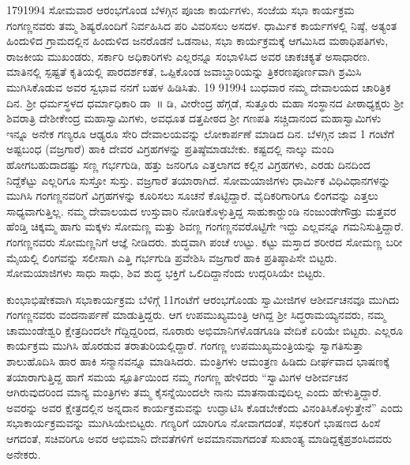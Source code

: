 {17\enginline{-}9\enginline{-}1994 ಸೋಮವಾರ ಆರಂಭಗೊಂಡ ಬೆಳಗ್ಗಿನ ಪೂಜಾ ಕಾರ್ಯಗಳು, ಸಂಜೆಯ ಸಭಾ ಕಾರ್ಯಕ್ರಮ ಗಂಗಣ್ಣನವರು ತಮ್ಮ ಶಿಷ್ಯರೊಂದಿಗೆ ನಿರ್ವಹಿಸಿದ ಪರಿ ವಿವರಿಸಲು ಅಸದಳ. ಧಾರ್ಮಿಕ ಕಾರ್ಯಗಳಲ್ಲಿ ನಿಷ್ಠೆ, ಅತ್ಯಂತ ಹಿಂದುಳಿದ ಗ್ರಾಮ\-ದಲ್ಲಿನ ಹಿಂದುಳಿದ ಜನರೊಡನೆ ಒಡನಾಟ, ಸಭಾ ಕಾರ್ಯಕ್ರಮಕ್ಕೆ ಆಗಮಿಸಿದ ಮಠಾಧಿ\-ಪತಿಗಳು, ರಾಜಕೀಯ  ಮುಖಂಡರು,  ಸರ್ಕಾರಿ ಅಧಿಕಾರಿಗಳು ಎಲ್ಲರನ್ನೂ ಸಂಭಾಳಿಸಿದ ಅವರ ಚಾಕಚಕ್ಯತೆ ಅಸಾಧಾರಣ. ಮಾತಿನಲ್ಲಿ ಸ್ಪಷ್ಟತೆ ಕೃತಿಯಲ್ಲಿ ಪಾರದರ್ಶಕತೆ, ಒಪ್ಪಿಕೊಂಡ ಜವಾಬ್ದಾರಿಯನ್ನು ತ್ರಿಕರಣಪೂರ್ಣವಾಗಿ ಶ್ರಮಿಸಿ ಮುಗಿಸಿಕೊಡುವ ಅವರ ಸ್ವಭಾವ ನನಗೆ ಬಹಳ ಹಿಡಿಸಿತು. 19 \enginline{-}9\enginline{-}1994 ಬುಧವಾರ ನಮ್ಮ ದೇವಾಲಯದ ಚಾರಿತ್ರಿಕ ದಿನ. ಶ್ರೀ ಧರ್ಮಸ್ಥಳದ ಧರ್ಮಾಧಿಕಾರಿ ಡಾ~॥ ಡಿ, ವೀರೇಂದ್ರ ಹೆಗ್ಗಡೆ, ಸುತ್ತೂರು ಮಹಾ ಸಂಸ್ಥಾನದ ಪೀಠಾಧ್ಯಕ್ಷರು ಶ್ರೀ ಶಿವರಾತ್ರಿ ದೇಶೀಕೇಂದ್ರ ಮಹಾಸ್ವಾಮಿಗಳು, ಅವಧೂತ ದತ್ತಪೀಠದ ಶ್ರೀ ಗಣಪತಿ ಸಚ್ಚಿದಾನಂದ ಮಹಾಸ್ವಾಮಿಗಳು ಇನ್ನೂ ಅನೇಕ ಗಣ್ಯರೂ ಆಢ್ಯರೂ ಸೇರಿ ದೇವಾಲಯವನ್ನು ಲೋಕಾರ್ಪಣೆ ಮಾಡಿದ ದಿನ. ಬೆಳಗ್ಗಿನ ಜಾವ 1 ಗಂಟೆಗೆ ಅಷ್ಟಬಂಧ (ವಜ್ರಗಾರೆ) ಹಾಕಿ ದೇವರ ವಿಗ್ರಹಗಳನ್ನು  ಪ್ರತಿಷ್ಠೆಮಾಡಬೇಕು. ಕಷ್ಟದಲ್ಲಿ ನಾಲ್ಕು ಮಂದಿ ಹೋಗಬಹುದಾದಷ್ಟು ಸಣ್ಣ ಗರ್ಭಗುಡಿ, ಹತ್ತು ಜನರಿಗೂ ಎತ್ತಲಾಗದ ಕಲ್ಲಿನ ವಿಗ್ರಹಗಳು, ಎರಡು ದಿನದಿಂದ ನಿದ್ದೆಕೆಟ್ಟು ಎಲ್ಲರಿಗೂ ಸುಸ್ತೋ ಸುಸ್ತು. ವಜ್ರಗಾರೆ ತಯಾರಾಗಿದೆ. ಸೋಮಯಾಜಿಗಳು ಧಾರ್ಮಿಕ ವಿಧಿವಿಧಾನಗಳನ್ನು ಮುಗಿಸಿ ಗಂಗಣ್ಣನವರಿಗೆ ವಿಗ್ರಹಗಳನ್ನು ಕೂರಿಸಲು ಸೂಚನೆ ಕೊಟ್ಟಿದ್ದಾರೆ. ವೈದಿಕರಿ\-ಗಾರಿಗೂ ಲಿಂಗವನ್ನು ಎತ್ತಲು ಸಾಧ್ಯವಾಗುತ್ತಿಲ್ಲ. ನಮ್ಮ ದೇವಾಲಯದ ಉಸ್ತುವಾರಿ ನೋಡಿಕೊಳ್ಳುತ್ತಿದ್ದ ಸಾಹುಕಾರ್‍ಹುಂಡಿ ನಂಜುಂಡೇಗೌಡ್ರು ಮತ್ತವರ ಹೆಂಡ್ತಿ ಚಿಕ್ಕಮ್ಮ ಹಾಗು ಮಕ್ಕಳು ಸೋಮಣ್ಣ ಮತ್ತು ಶಿವಣ್ಣ ಗಂಗಣ್ಣನವರೊಟ್ಟಿಗೇ ಇದ್ದು ಎಲ್ಲವನ್ನೂ ಗಮನಿಸುತ್ತಿದ್ದಾರೆ. ಗಂಗಣ್ಣನವರು ಸೋಮಣ್ಣನಿಗೆ ಆಜ್ಞೆ ನೀಡಿದರು. ಶುದ್ಧವಾಗಿ ಪಂಚೆ ಉಟ್ಟು. ಕಟ್ಟು ಮಸ್ತಾದ ಶರೀರದ ಸೋಮಣ್ಣ ಬರೀ ಮೈಯಲ್ಲಿ ಲಿಂಗವನ್ನು ಸಲೀಸಾಗಿ ಎತ್ತಿ ಗರ್ಭಗುಡಿ ಪ್ರವೇಶಿಸಿ ವಜ್ರಗಾರೆ ಹಾಕಿ ಪ್ರತಿಷ್ಠಾಪಿಸೇ ಬಿಟ್ಟರು. ಸೋಮಯಾಜಿಗಳು ಸಾಧು ಸಾಧು, ಶಿವ ಶುದ್ಧ ಭಕ್ತಿಗೆ ಒಲಿದಿದ್ದಾನೆಂದು ಉದ್ಗರಿಸಿಯೇ ಬಿಟ್ಟರು.

ಕುಂಭಾಭಿಷೇಕವಾಗಿ ಸಭಾಕಾರ್ಯಕ್ರಮ ಬೆಳಿಗ್ಗೆ 11ಗಂಟೆಗೆ ಆರಂಭಗೊಂಡು ಸ್ವಾಮೀಜಿಗಳ ಆಶೀರ್ವಚನವೂ ಮುಗಿದು ಗಂಗಣ್ಣನವರು ವಂದನಾರ್ಪಣೆ ಮಾಡುತ್ತಿದ್ದರು. ಆಗ ಉಪಮುಖ್ಯಮಂತ್ರಿ ಆಗಿದ್ದ ಶ್ರೀ ಸಿದ್ಧರಾಮಯ್ಯನವರು, ನಮ್ಮ ಚಾಮುಂಡೇ\-ಶ್ವರಿ ಕ್ಷೇತ್ರದಿಂದಲೇ ಗೆದ್ದಿದ್ದರಿಂದ, ನೂರಾರು ಅಭಿಮಾನಿಗಳೊಡಗೂಡಿ ವೇದಿಕೆ ಏರಿಯೇ ಬಿಟ್ಟರು. ಎಲ್ಲರೂ ಕಾರ್ಯಕ್ರಮ ಮುಗಿಸಿ ಹೊರಡುವ ತರಾತುರಿಯಲ್ಲಿದ್ದಾರೆ. ಗಂಗಣ್ಣ ಉಪಮುಖ್ಯಮಂತ್ರಿಯನ್ನು ಸ್ವಾಗತಿಸುತ್ತಾ ಶಾಲುಹೊದಿಸಿ ಹಾರ ಹಾಕಿ ಸನ್ಮಾನವನ್ನೂ ಮಾಡಿಸಿದರು. ಮಂತ್ರಿಗಳು ಆಮಂತ್ರಣ ಹಿಡಿದು ದೀರ್ಘವಾದ ಭಾಷಣಕ್ಕೆ ತಯಾರಾಗುತ್ತಿದ್ದ ಹಾಗೆ ಸಮಯ ಸ್ಪೂರ್ತಿಯಿಂದ ನಮ್ಮ ಗಂಗಣ್ಣ ಹೇಳಿ\-ದರು  \enginline{-}   “ಸ್ವಾಮಿಗಳ ಆಶೀರ್ವಚನ ಆಗಿರುವುದರಿಂದ ಮಾನ್ಯ ಮಂತ್ರಿಗಳು ತಮ್ಮ ಕೈಸನ್ನೆ\-ಯಿಂದಲೇ ನಾನು ಮಾತನಾಡುವುದಿಲ್ಲ ಎಂದು ಹೇಳುತ್ತಿದ್ದಾರೆ. ಅವರನ್ನು ಅವರ ಕ್ಷೇತ್ರದಲ್ಲಿನ ಅನ್ನದಾನ ಕಾರ್ಯಕ್ರಮವನ್ನು ಉದ್ಘಾಟಿಸಿ ಕೊಡಬೇಕೆಂದು ವಿನಂತಿಸಿ\-ಕೊಳ್ಳುತ್ತೇನೆ” ಎಂದು ಸಭಾಕಾರ್ಯಕ್ರಮವನ್ನು ಮುಗಿಸಿಯೇಬಿಟ್ಟರು. ಗಣ್ಯರಿಗೆ ಯಾರಿಗೂ ನೋವಾಗದಂತೆ, ಸಭಿಕರಿಗೆ ಭಾಷಣದ ಹಿಂಸೆ ಆಗದಂತೆ, ಸಚಿವರಿಗೂ ಅವರ ಆಭಿಮಾನಿ ದೇವತೆಗಳಿಗೆ ಅವಮಾನವಾಗದಂತೆ ಸುಖಾಂತ್ಯ ಮಾಡಿದ್ದಕ್ಕೆ\break ಪ್ರಶಂಸಿದವರು ಅನೇಕರು.

}
